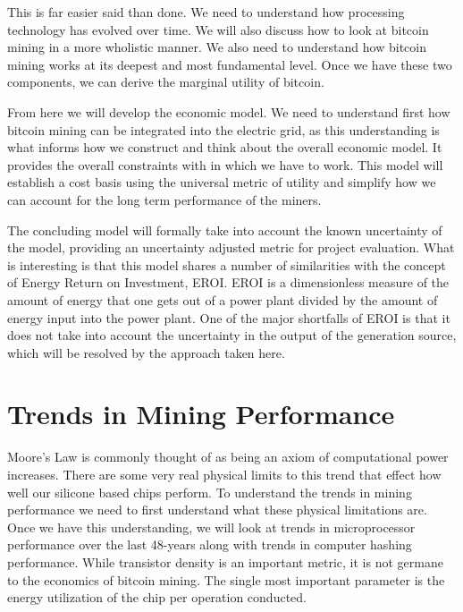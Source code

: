 \documentclass[runningheads]{llncs}
\begin{document}
This is far easier said than done.
We need to understand how processing technology has evolved over time.
We will also discuss how to look at bitcoin mining in a more wholistic manner.
We also need to understand how bitcoin mining works at its deepest and most fundamental level.
Once we have these two components, we can derive the marginal utility of bitcoin.

From here we will develop the economic model.
We need to understand first how bitcoin mining can be integrated into the electric grid, as this understanding is what informs how we construct and think about the overall economic model.
It provides the overall constraints with in which we have to work.
This model will establish a cost basis using the universal metric of utility and simplify how we can account for the long term performance of the miners.

The concluding model will formally take into account the known uncertainty of the model, providing an uncertainty adjusted metric for project evaluation.
What is interesting is that this model shares a number of similarities with the concept of Energy Return on Investment, EROI.
EROI is a dimensionless measure of the amount of energy that one gets out of a power plant divided by the amount of energy input into the power plant.
One of the major shortfalls of EROI is that it does not take into account the uncertainty in the output of the generation source, which will be resolved by the approach taken here.

\section{Trends in Mining Performance}
Moore's Law is commonly thought of as being an axiom of computational power increases.
There are some very real physical limits to this trend that effect how well our silicone based chips perform.
To understand the trends in mining performance we need to first understand what these physical limitations are.
Once we have this understanding, we will look at trends in microprocessor performance over the last 48-years along with trends in computer hashing performance.
While transistor density is an important metric, it is not germane to the economics of bitcoin mining.
The single most important parameter is the energy utilization of the chip per operation conducted.
\end{document}
